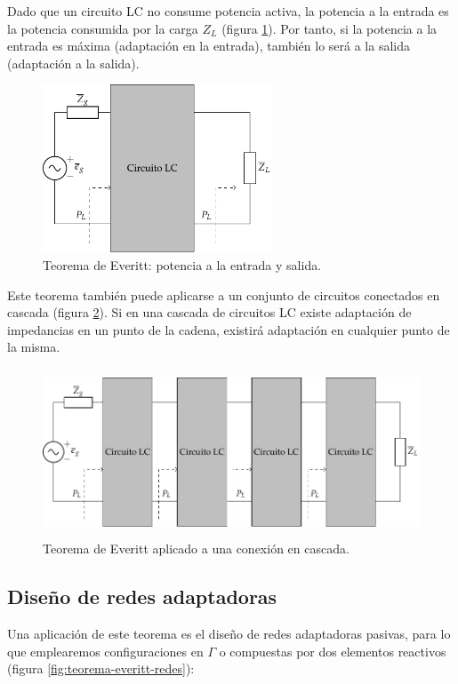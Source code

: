 Dado que un circuito LC no consume potencia activa, la potencia a la entrada es la potencia consumida por la carga $Z_L$ (figura \ref{fig:teorema-everitt-potencia}). Por tanto, si la potencia a la entrada es máxima (adaptación en la entrada), también lo será a la salida (adaptación a la salida).

\begin{figure}[H]
  \centering
  \includegraphics[height=5cm]{../figs/Everitt_potencia.pdf}
  \caption{Teorema de Everitt: potencia a la entrada y salida.}
  \label{fig:teorema-everitt-potencia}
\end{figure}

Este teorema también puede aplicarse a un conjunto de circuitos conectados en cascada (figura \ref{fig:teorema-everitt-cascada}). Si en una cascada de circuitos LC existe adaptación de impedancias en un punto de la cadena, existirá adaptación en cualquier punto de la misma.

\begin{figure}[H]
  \centering
  \includegraphics[height=5cm]{../figs/Everitt_cascada.pdf}
  \caption{Teorema de Everitt aplicado a una conexión en cascada.}
  \label{fig:teorema-everitt-cascada}
\end{figure}


\subsection{Diseño de redes adaptadoras}
\label{sec:everitt-diseño}

Una aplicación de este teorema es el diseño de redes adaptadoras
pasivas, para lo que emplearemos configuraciones en $\Gamma$ o
 compuestas por dos elementos reactivos (figura
\ref{fig:teorema-everitt-redes}):

